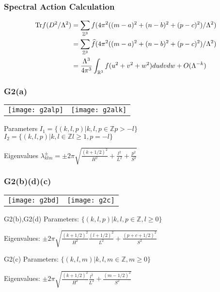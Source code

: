 \documentclass{beamer}
\def\Z{{\mathbb Z}}
\def\R{{\mathbb R}}
\def\Tr{{\rm Tr}}
\begin{document}
\begin{frame}
	\frametitle{Spectral Action Calculation}
	\begin{block}{}
		\begin{align*}
			\Tr f(D^2/\Lambda ^2) &= \sum_{\Z ^3} f(4 \pi ^2 ((m-a)^2 + (n-b)^2 + (p-c)^2)/\Lambda ^2) \\
			&= \sum_{\Z^3} \widehat{f}(4 \pi ^2 ((m-a)^2 + (n-b)^2 + (p-c)^2)/\Lambda ^2) \\
			&= \frac{\Lambda^3}{4\pi ^3} \int_{\R ^3}f(u^2 + v^2 + w^2)dudvdw + O(\Lambda^{-k})
		\end{align*}
	\end{block}
\end{frame}

\begin{frame}
	\frametitle{G2(a)}
		\begin{tabular}[]{lr}
\texttt{[image: g2alp]} & \texttt{[image: g2alk]}\\
		\end{tabular}

		\begin{block}{Parameters}
			$I_1 = \{(k,l,p)| k,l,p \in \Z p > -l \}$
			$I_2 = \{(k,l,p)| k,l \in \Z l \geq 1, p = -l \}$
		\end{block}
		\begin{block}{Eigenvalues}
			$\lambda_{klm}^{\pm} = \pm 2 \pi \sqrt{\frac{(k + 1/2)^2}{H^2} + \frac{l^2}{L^2} + \frac{p^2}{S^2}}$
		\end{block}
\end{frame}

\begin{frame}
	\frametitle{G2(b)(d)(c)}
		\begin{tabular}[]{lr}
\texttt{[image: g2bd]} & \texttt{[image: g2c]}\\
		\end{tabular}
		\begin{block}{G2(b),G2(d)}
			Parameters: $\{(k,l,p)| k,l,p \in \Z, l \geq 0\}$

			Eigenvalues: $\pm 2\pi\sqrt{\frac{(k+1/2)^2}{H^2}\frac{(l+1/2)^2}{L^2} + \frac{(p+c+1/2)^2}{S^2}}$
		\end{block}
		\begin{block}{G2(c)}
			Parameters: $\{(k,l,m)| k,l,m \in \Z, m \geq 0\}$

			Eigenvalues: $\pm 2\pi\sqrt{\frac{(k+1/2)^2}{H^2}\frac{l^2}{L^2} + \frac{(m-1/2)^2}{S^2}}$
		\end{block}
\end{frame}
\end{document}
